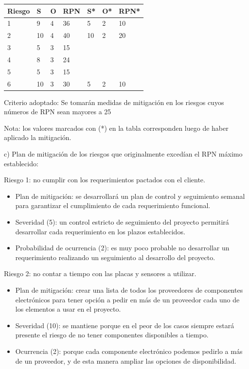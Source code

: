 \documentclass[11pt]{charter}
\begin{document}
\begin{table}[htpb]
\centering
\begin{tabularx}{\linewidth}{@{}|X|X|X|X|X|X|X|@{}}
\hline
\rowcolor[HTML]{C0C0C0} 
Riesgo & S & O & RPN & S* & O* & RPN* \\ \hline
  1     & 9  & 4  & \cellcolor[HTML]{f5b7b1} 36    & 5   &  2  &   \cellcolor[HTML]{d6eaf8} 10   \\ \hline
  2     &  10 & 4  & \cellcolor[HTML]{f5b7b1} 40   &  10  &  2  & \cellcolor[HTML]{d6eaf8} 20    \\ \hline
  3     &  5 & 3  & \cellcolor[HTML]{d6eaf8}  15  &    &    &      \\ \hline
  4     & 8  &  3 &\cellcolor[HTML]{d6eaf8}  24   &    &    &      \\ \hline
  5     & 5  &  3 & \cellcolor[HTML]{d6eaf8} 15   &    &    &      \\ \hline
  6     & 10  & 3  & \cellcolor[HTML]{f5b7b1} 30   & 5   & 2   & \cellcolor[HTML]{d6eaf8} 10    \\ \hline
\end{tabularx}%
\end{table}

Criterio adoptado: 
Se tomarán medidas de mitigación en los riesgos cuyos números de RPN sean mayores a 25

Nota: los valores marcados con (*) en la tabla corresponden luego de haber aplicado la mitigación.

c) Plan de mitigación de los riesgos que originalmente excedían el RPN máximo establecido:
 
 
Riesgo 1: no cumplir con los requerimientos pactados con el cliente.
\begin{itemize}
\item Plan de mitigación: se desarrollará un plan de control y seguimiento semanal para garantizar el cumplimiento de cada requerimiento funcional.
\item Severidad (5): un control estricto de seguimiento del proyecto permitirá desarrollar cada requerimiento en los plazos establecidos.
\item Probabilidad de ocurrencia (2): es muy poco probable no desarrollar un requerimiento realizando un seguimiento al desarrollo del proyecto. 
\end{itemize}  
 
Riesgo 2: no contar a tiempo con las placas y sensores a utilizar.
\begin{itemize}
\item Plan de mitigación: crear una lista de todos los proveedores de componentes electrónicos para tener opción a pedir en más de un proveedor cada uno de los elementos a usar en el proyecto.
\item Severidad (10): se mantiene porque en el peor de los casos siempre estará presente el riesgo de no tener componentes disponibles a tiempo. 
\item Ocurrencia (2): porque cada componente electrónico podemos pedirlo a más de un proveedor, y de esta manera ampliar las opciones de disponibilidad.
\end{itemize}
\end{document}
